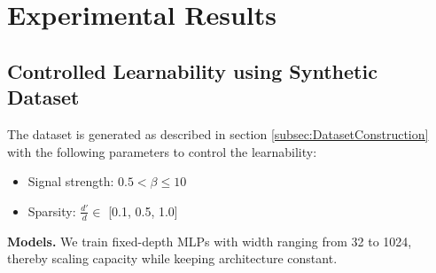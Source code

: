 \documentclass{article}
\begin{document}




\section{Experimental Results}\label{section:experimental_results}

\subsection{Controlled Learnability using Synthetic Dataset}
The dataset is generated as described in section \ref{subsec:DatasetConstruction} with the following parameters
to control the learnability:

\begin{itemize}
    \item Signal strength: $0.5 < \beta \leq 10$
    \item Sparsity: $\frac{d'}{d} \in $ [0.1,  0.5,  1.0]
\end{itemize}

\vspace{0.3em}
\noindent
\textbf{Models.} We train fixed-depth MLPs with width ranging from 32 to 1024, 
thereby scaling capacity while keeping architecture constant.
\end{document}
